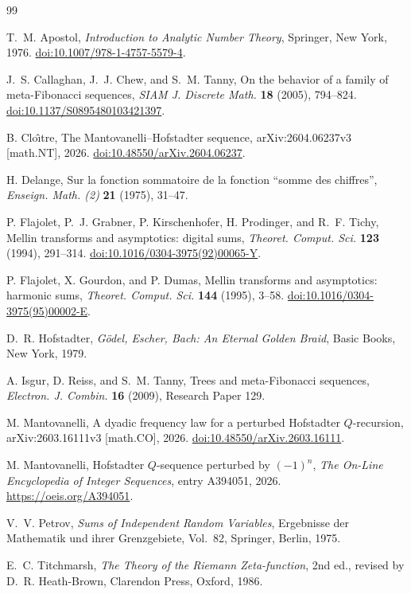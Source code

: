 \documentclass[11pt]{article}
\theoremstyle{definition}
\theoremstyle{remark}
\begin{document}
\begin{thebibliography}{99}
\small

T.~M. Apostol,
\emph{Introduction to Analytic Number Theory},
Springer, New York, 1976.
\href{https://doi.org/10.1007/978-1-4757-5579-4}
{doi:10.1007/978-1-4757-5579-4}.

J.~S. Callaghan, J.~J. Chew, and S.~M. Tanny,
On the behavior of a family of meta-Fibonacci sequences,
\emph{SIAM J. Discrete Math.} \textbf{18} (2005), 794--824.
\href{https://doi.org/10.1137/S0895480103421397}
{doi:10.1137/S0895480103421397}.

B. Clo\^{\i}tre,
The Mantovanelli--Hofstadter sequence,
arXiv:2604.06237v3 [math.NT], 2026.
\href{https://doi.org/10.48550/arXiv.2604.06237}
{doi:10.48550/arXiv.2604.06237}.

H. Delange,
Sur la fonction sommatoire de la fonction ``somme des chiffres'',
\emph{Enseign. Math. (2)} \textbf{21} (1975), 31--47.

P. Flajolet, P.~J. Grabner, P. Kirschenhofer, H. Prodinger, and R.~F. Tichy,
Mellin transforms and asymptotics: digital sums,
\emph{Theoret. Comput. Sci.} \textbf{123} (1994), 291--314.
\href{https://doi.org/10.1016/0304-3975(92)00065-Y}
{doi:10.1016/0304-3975(92)00065-Y}.

P. Flajolet, X. Gourdon, and P. Dumas,
Mellin transforms and asymptotics: harmonic sums,
\emph{Theoret. Comput. Sci.} \textbf{144} (1995), 3--58.
\href{https://doi.org/10.1016/0304-3975(95)00002-E}
{doi:10.1016/0304-3975(95)00002-E}.

D.~R. Hofstadter,
\emph{G\"odel, Escher, Bach: An Eternal Golden Braid},
Basic Books, New York, 1979.

A. Isgur, D. Reiss, and S.~M. Tanny,
Trees and meta-Fibonacci sequences,
\emph{Electron. J. Combin.} \textbf{16} (2009), Research Paper 129.

M. Mantovanelli,
A dyadic frequency law for a perturbed Hofstadter $Q$-recursion,
arXiv:2603.16111v3 [math.CO], 2026.
\href{https://doi.org/10.48550/arXiv.2603.16111}
{doi:10.48550/arXiv.2603.16111}.

M. Mantovanelli,
Hofstadter $Q$-sequence perturbed by $(-1)^n$,
\emph{The On-Line Encyclopedia of Integer Sequences},
entry A394051, 2026.
\href{https://oeis.org/A394051}{https://oeis.org/A394051}.

V.~V. Petrov,
\emph{Sums of Independent Random Variables},
Ergebnisse der Mathematik und ihrer Grenzgebiete, Vol.~82,
Springer, Berlin, 1975.

E.~C. Titchmarsh,
\emph{The Theory of the Riemann Zeta-function}, 2nd ed.,
revised by D.~R. Heath-Brown, Clarendon Press, Oxford, 1986.

\end{thebibliography}
\end{document}
